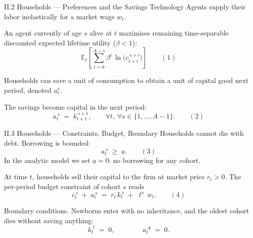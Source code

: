 \documentclass[aspectratio=169,11pt]{beamer}
\newcommand{\emphc}[1]{\textcolor{harvardcrimson}{#1}}
\begin{document}
\begin{frame}{II.2 Households --- Preferences and the Savings Technology}
\small
Agents supply their labor \emphc{inelastically} for a market wage $w_t$.

\vspace{0.6em}
An agent \emphc{currently of age $s$} alive at $t$ maximises remaining time-separable discounted expected lifetime utility ($\beta < 1$):
\[
\mathbb{E}_t\!\left[\sum_{i=0}^{A-s} \beta^i \,\ln\!\bigl(c_{t+i}^{\,s+i}\bigr)\right] \qquad (1)
\]

\vspace{0.3em}
Households can save a unit of consumption to obtain a unit of capital good next period, denoted $a_t^s$.

\vspace{0.4em}
The savings become \emphc{capital in the next period}:
\[
a_t^{\,s} \;=\; k_{t+1}^{\,s+1}, \qquad \forall t,\ \forall s \in \{1, \ldots, A-1\}. \qquad (2)
\]
\end{frame}


\begin{frame}{II.3 Households --- Constraints, Budget, Boundary}
\small
Households \emphc{cannot die with debt}.  Borrowing is bounded:
\[
a_t^{\,s} \;\ge\; \underline{a}. \qquad (3)
\]
In the analytic model we set $\underline{a} = 0$: \emphc{no borrowing} for any cohort.

\vspace{0.4em}
At time $t$, households sell their capital to the firm at market price $r_t > 0$.  The per-period \emphc{budget constraint} of cohort $s$ reads
\[
c_t^{\,s} \;+\; a_t^{\,s} \;=\; r_t\, k_t^{\,s} \;+\; \ell^s\, w_t. \qquad (4)
\]

\vspace{0.4em}
\emphc{Boundary conditions.}  Newborns enter with no inheritance, and the oldest cohort dies without saving anything:
\[
k_t^{\,1} \;=\; 0, \qquad\qquad a_t^{\,A} \;=\; 0.
\]
\end{frame}
\end{document}
